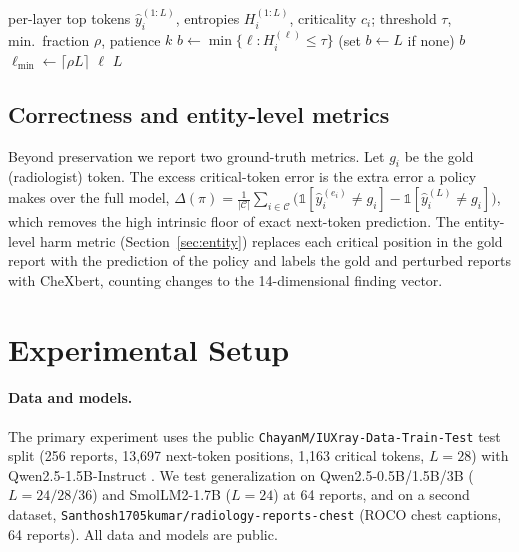 \documentclass[11pt]{article}
\newcommand{\method}{\mbox{TokenTriage}}
\newcommand{\critset}{\mathcal{C}}
\begin{document}
\begin{algorithm}[t]
\caption{\method{} exit decision for position $i$}
\label{alg:tt}
\begin{algorithmic}[1]
\Require per-layer top tokens $\hat y_i^{(1:L)}$, entropies $H_i^{(1:L)}$, criticality $c_i$;
threshold $\tau$, min.\ fraction $\rho$, patience $k$
\State $b \gets \min\{\ell : H_i^{(\ell)} \le \tau\}$ \quad(set $b\gets L$ if none) 
 \State \Return $b$ 
\EndIf
\State $\ell_{\min} \gets \lceil \rho L \rceil$
   \State \Return $\ell$ 
  \EndIf
\EndFor
\State \Return $L$
\end{algorithmic}
\end{algorithm}

\subsection{Correctness and entity-level metrics}
Beyond preservation we report two ground-truth metrics. Let $g_i$ be the gold (radiologist) token. The
excess critical-token error is the extra error a policy makes over the full model,
$\Delta(\pi)=\frac{1}{|\critset|}\sum_{i\in\critset}\big(\mathbb{1}[\hat y_i^{(e_i)}\neq
g_i]-\mathbb{1}[\hat y_i^{(L)}\neq g_i]\big)$, which removes the high intrinsic floor of exact
next-token prediction. The entity-level harm metric (Section~\ref{sec:entity}) replaces each critical
position in the gold report with the prediction of the policy and labels the gold and perturbed reports with
CheXbert, counting changes to the 14-dimensional finding vector.

\section{Experimental Setup}
\label{sec:setup}
\paragraph{Data and models.}
The primary experiment uses the public \texttt{ChayanM/IUXray-Data-Train-Test} test split (256 reports,
13{,}697 next-token positions, 1{,}163 critical tokens, $L{=}28$) with Qwen2.5-1.5B-Instruct
\cite{qwen25}. We test generalization on Qwen2.5-0.5B/1.5B/3B ($L=24/28/36$) and SmolLM2-1.7B
\cite{smollm2} ($L=24$) at 64 reports, and on a
second dataset, \texttt{Santhosh1705kumar/radiology-reports-chest} (ROCO chest captions, 64 reports).
All data and models are public.
\end{document}
